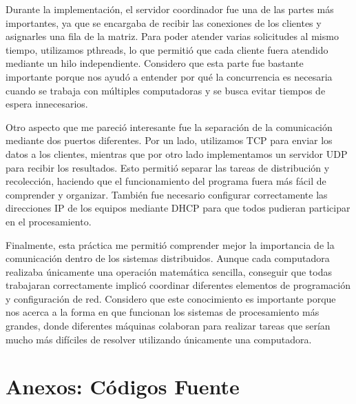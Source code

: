 Durante la implementación, el servidor coordinador fue una de las partes más importantes, ya que se encargaba de recibir las conexiones de los clientes y asignarles una fila de la matriz. Para poder atender varias solicitudes al mismo tiempo, utilizamos pthreads, lo que permitió que cada cliente fuera atendido mediante un hilo independiente. Considero que esta parte fue bastante importante porque nos ayudó a entender por qué la concurrencia es necesaria cuando se trabaja con múltiples computadoras y se busca evitar tiempos de espera innecesarios.

Otro aspecto que me pareció interesante fue la separación de la comunicación mediante dos puertos diferentes. Por un lado, utilizamos TCP para enviar los datos a los clientes, mientras que por otro lado implementamos un servidor UDP para recibir los resultados. Esto permitió separar las tareas de distribución y recolección, haciendo que el funcionamiento del programa fuera más fácil de comprender y organizar. También fue necesario configurar correctamente las direcciones IP de los equipos mediante DHCP para que todos pudieran participar en el procesamiento.

Finalmente, esta práctica me permitió comprender mejor la importancia de la comunicación dentro de los sistemas distribuidos. Aunque cada computadora realizaba únicamente una operación matemática sencilla, conseguir que todas trabajaran correctamente implicó coordinar diferentes elementos de programación y configuración de red. Considero que este conocimiento es importante porque nos acerca a la forma en que funcionan los sistemas de procesamiento más grandes, donde diferentes máquinas colaboran para realizar tareas que serían mucho más difíciles de resolver utilizando únicamente una computadora.

\clearpage


\section*{Anexos: Códigos Fuente}


